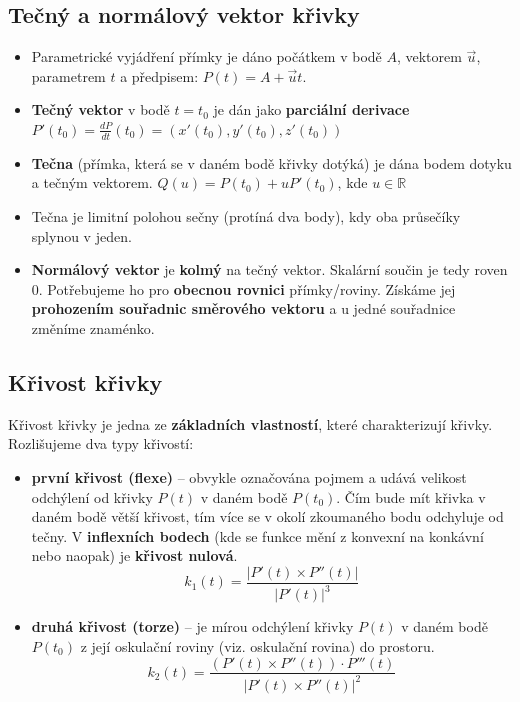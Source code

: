 \subsection{Tečný a normálový vektor křivky}
\begin{itemize}
	\item Parametrické vyjádření přímky je dáno počátkem v bodě $ A $, vektorem $ \vec{u} $, parametrem $ t $ a předpisem: $P(t) = A + \vec{u}t.$
	\item \textbf{Tečný vektor} v bodě $t=t_0$ je dán jako \textbf{parciální derivace} $P'(t_0) = \frac{dP}{dt}(t_0) = (x'(t_0), y'(t_0), z'(t_0))$
	\item \textbf{Tečna} (přímka, která se v daném bodě křivky dotýká) je dána bodem dotyku a tečným vektorem. $Q(u) = P(t_0) + uP'(t_0)$, kde $u \in \mathbb{R}$
	\item Tečna je limitní polohou sečny (protíná dva body), kdy oba průsečíky splynou v jeden.
\end{itemize}
\begin{itemize}
	\item \textbf{Normálový vektor} je \textbf{kolmý} na tečný vektor. Skalární součin je tedy roven 0. Potřebujeme ho pro \textbf{obecnou rovnici} přímky/roviny. Získáme jej \textbf{prohozením souřadnic směrového vektoru} a u jedné souřadnice změníme znaménko.
\end{itemize}

\subsection{Křivost křivky}
Křivost křivky je jedna ze \textbf{základních vlastností}, které charakterizují křivky. Rozlišujeme dva typy křivostí:
\begin{itemize}
	\item \textbf{první křivost (flexe)} -- obvykle označována pojmem  a udává velikost odchýlení od křivky $P(t)$ v daném bodě $P(t_0)$. Čím bude mít křivka v daném bodě větší křivost, tím více se v okolí zkoumaného bodu odchyluje od tečny. V \textbf{inflexních bodech} (kde se funkce mění z konvexní na konkávní nebo naopak) je \textbf{křivost nulová}.
		\begin{equation*}
				k_1(t) = \frac{|P'(t) \times P''(t)|}{|P'(t)|^3}
	\end{equation*}
	\item \textbf{druhá křivost (torze)} -- je mírou odchýlení křivky $P(t)$ v daném bodě $P(t_0)$ z její oskulační roviny (viz. oskulační rovina) do prostoru.
	\begin{equation*}
				k_2(t) = \frac{(P'(t) \times P''(t)) \cdot P'''(t)}{|P'(t) \times P''(t)|^2}
	\end{equation*}
\end{itemize}
